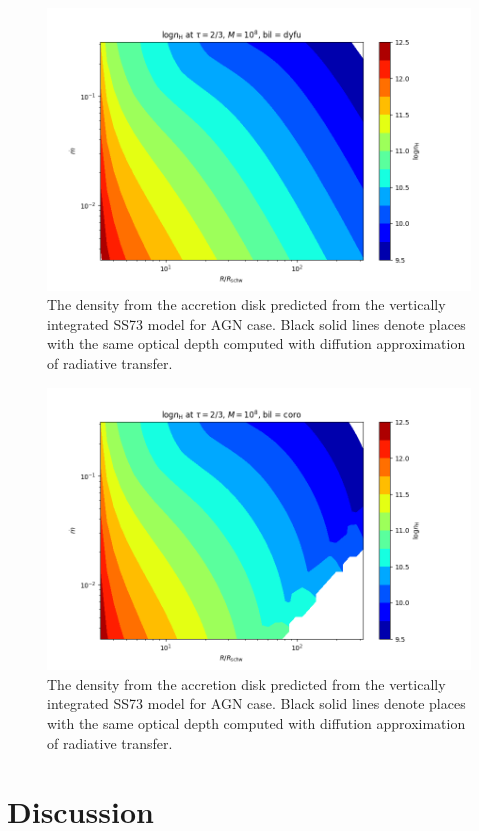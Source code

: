 \documentclass[preprint2]{aastex6}
\begin{document}
\begin{figure}
 \includegraphics[scale=0.45]{plotgen/map8d.png}
 \caption{The density from the accretion disk predicted from the vertically integrated SS73 model for AGN case.  
 Black solid lines denote places with the same optical depth computed with diffution approximation of radiative transfer.}
 \label{fig:mapa3}
\end{figure}

\begin{figure}
 \includegraphics[scale=0.45]{plotgen/map8x.png}
 \caption{The density from the accretion disk predicted from the vertically integrated SS73 model for AGN case.  
 Black solid lines denote places with the same optical depth computed with diffution approximation of radiative transfer.}
 \label{fig:mapa4}
\end{figure}

\section{Discussion}
\label{sec:data}
\end{document}
